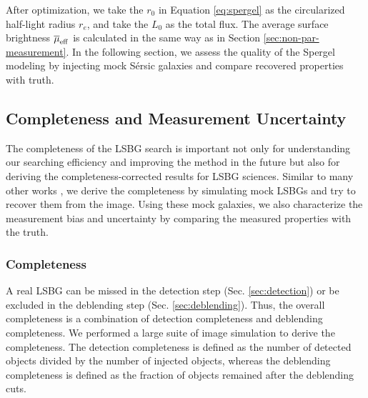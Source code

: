 \documentclass[twocolumn,astrosymb,twocolappendix]{aastex631}
\newcommand{\sersic}{S\'ersic}
\begin{document}
\begin{CJK*}{UTF8}{gbsn}
After optimization, we take the $r_0$ in Equation \eqref{eq:spergel} as the circularized half-light radius $r_e$, and take the $L_0$ as the total flux. The average surface brightness $\overline{\mu}_{\rm eff}$ is calculated in the same way as in Section \ref{sec:non-par-measurement}. In the following section, we assess the quality of the Spergel modeling by injecting mock \sersic{} galaxies and compare recovered properties with truth. 


\subsection{Completeness and Measurement Uncertainty}\label{sec:comp_meas}
The completeness of the LSBG search is important not only for understanding our searching efficiency and improving the method in the future but also for deriving the completeness-corrected results for LSBG sciences. Similar to many other works \citep[e.g.,][]{Zaritsky2021,CarlstenELVES2022,Greene2022}, we derive the completeness by simulating mock LSBGs and try to recover them from the image. Using these mock galaxies, we also characterize the measurement bias and uncertainty by comparing the measured properties with the truth. 


\subsubsection{Completeness}\label{sec:completeness}
A real LSBG can be missed in the detection step (Sec. \ref{sec:detection}) or be excluded in the deblending step (Sec. \ref{sec:deblending}). Thus, the overall completeness is a combination of detection completeness and deblending completeness. We performed a large suite of image simulation to derive the completeness. The detection completeness is defined as the number of detected objects divided by the number of injected objects, whereas the deblending completeness is defined as the fraction of objects remained after the deblending cuts. 


\end{CJK*}
\end{document}
